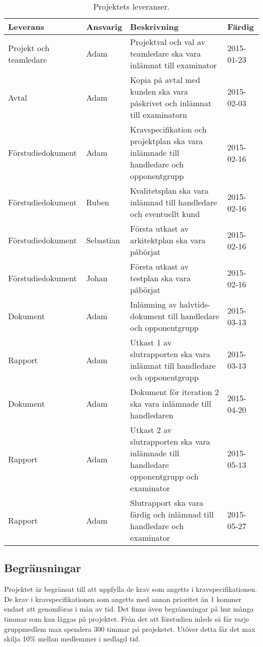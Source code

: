 \begin{table}[H]
  \centering
    \begin{tabularx}{\textwidth}{| X | l | X | l |}
      \hline
      \textbf{Leverans} & \textbf{Ansvarig} & \textbf{Beskrivning} & \textbf{Färdig} \\
      \hline

      {Projekt och teamledare} & {Adam} & {Projektval och val av teamledare ska vara inlämnat till examinator} & {2015-01-23} \\
            \hline
      {Avtal} & {Adam} & {Kopia på avtal med kunden ska vara påskrivet och inlämnat till examinatorn} & {2015-02-03} \\
      \hline
      {Förstudiedokument} & {Adam} & {Kravspecifikation och projektplan ska vara inlämnade till handledare och opponentgrupp} & {2015-02-16} \\
      \hline
      {Förstudiedokument} & {Ruben} & {Kvalitetsplan ska vara inlämnad till handledare och eventuellt kund} & {2015-02-16} \\
      \hline
      {Förstudiedokument} & {Sebastian} & {Första utkast av arkitektplan ska vara påbörjat} & {2015-02-16} \\
      \hline
      {Förstudiedokument} & {Johan} & {Första utkast av testplan ska vara påbörjat} & {2015-02-16} \\
      \hline
      {Dokument} & {Adam} & {Inlämning av halvtids-dokument till handledare och opponentgrupp} & {2015-03-13} \\
      \hline
      {Rapport} & {Adam} & {Utkast 1 av slutrapporten ska vara inlämnat till handledare och opponentgrupp} & {2015-03-13} \\
      \hline
      {Dokument} & {Adam} & {Dokument för iteration 2 ska vara inlämnade till handledaren} & {2015-04-20} \\
      \hline
      {Rapport} & {Adam} & {Utkast 2 av slutrapporten ska vara inlämnade till handledare opponentgrupp och examinator} & {2015-05-13} \\
      \hline
      {Rapport} & {Adam} & {Slutrapport ska vara färdig och inlämnad till handledare och examinator} & {2015-05-27} \\
      \hline

    \end{tabularx}
  \caption{Projektets leveranser.} \label{dokumentation:tabell}
\end{table}



\subsection{Begränsningar}

Projektet är begränsat till att uppfylla de krav som angetts i kravspecifikationen. De krav i kravspecifikationen som angetts med annan prioritet än 1 kommer endast att genomföras i mån av tid. Det finns även begränsningar på hur många timmar som kan läggas på projektet. Från det att förstudien inleds så får varje gruppmedlem max spendera 300 timmar på projeketet. Utöver detta får det max skilja 10\% mellan medlemmer i nedlagd tid.
